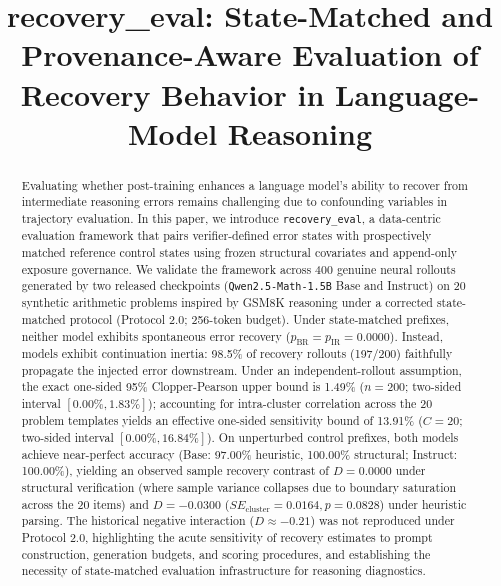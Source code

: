 \documentclass[10pt,conference]{IEEEtran}
\begin{document}
\title{recovery\_eval: State-Matched and Provenance-Aware Evaluation of Recovery Behavior in Language-Model Reasoning}

\author{
}

\maketitle

\begin{abstract}
Evaluating whether post-training enhances a language model's ability to recover from intermediate reasoning errors remains challenging due to confounding variables in trajectory evaluation. In this paper, we introduce \texttt{recovery\_eval}, a data-centric evaluation framework that pairs verifier-defined error states with prospectively matched reference control states using frozen structural covariates and append-only exposure governance. We validate the framework across 400 genuine neural rollouts generated by two released checkpoints (\texttt{Qwen2.5-Math-1.5B} Base and Instruct) on 20 synthetic arithmetic problems inspired by GSM8K reasoning under a corrected state-matched protocol (Protocol 2.0; 256-token budget). Under state-matched prefixes, neither model exhibits spontaneous error recovery ($p_{\text{BR}} = p_{\text{IR}} = 0.0000$). Instead, models exhibit continuation inertia: 98.5\% of recovery rollouts (197/200) faithfully propagate the injected error downstream. Under an independent-rollout assumption, the exact one-sided 95\% Clopper-Pearson upper bound is 1.49\% ($n=200$; two-sided interval $[0.00\%, 1.83\%]$); accounting for intra-cluster correlation across the 20 problem templates yields an effective one-sided sensitivity bound of 13.91\% ($C=20$; two-sided interval $[0.00\%, 16.84\%]$). On unperturbed control prefixes, both models achieve near-perfect accuracy (Base: 97.00\% heuristic, 100.00\% structural; Instruct: 100.00\%), yielding an observed sample recovery contrast of $D = 0.0000$ under structural verification (where sample variance collapses due to boundary saturation across the 20 items) and $D = -0.0300$ ($SE_{\text{cluster}} = 0.0164, p = 0.0828$) under heuristic parsing. The historical negative interaction ($D \approx -0.21$) was not reproduced under Protocol 2.0, highlighting the acute sensitivity of recovery estimates to prompt construction, generation budgets, and scoring procedures, and establishing the necessity of state-matched evaluation infrastructure for reasoning diagnostics.
\end{abstract}
\end{document}
